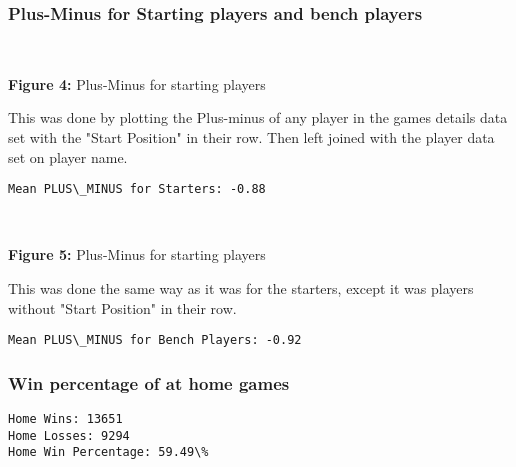 \documentclass[11pt]{article}
\begin{document}
    \subsubsection{Plus-Minus for Starting players and bench players}

   
    \begin{center}
    \end{center}
    { \hspace*{\fill} \\}
\begin{center}
        \textbf{Figure 4:} Plus-Minus for starting players
    \end{center}

\medskip

This was done by plotting the Plus-minus of any player in the games details data set with the "Start Position" in their row. Then left joined with the player data set on player name.

    \medskip

    
    \begin{Verbatim}[commandchars=\\\{\}]
Mean PLUS\_MINUS for Starters: -0.88
    \end{Verbatim}

    \begin{center}
    \end{center}
    { \hspace*{\fill} \\}
    \begin{center}
        \textbf{Figure 5:} Plus-Minus for starting players
    \end{center}

\medskip

This was done the same way as it was for the starters, except it was players without "Start Position" in their row.

\medskip

    \begin{Verbatim}[commandchars=\\\{\}]
Mean PLUS\_MINUS for Bench Players: -0.92
    \end{Verbatim}


\subsubsection{Win percentage of at home games}
    \begin{Verbatim}[commandchars=\\\{\}]
Home Wins: 13651
Home Losses: 9294
Home Win Percentage: 59.49\%
    \end{Verbatim}
\end{document}
